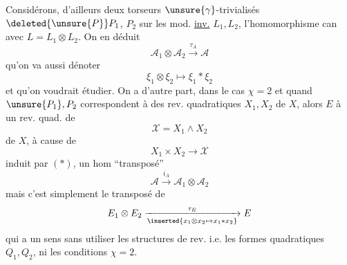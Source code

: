 Considérons, d'ailleurs deux torseurs $\unsure{\gamma}$-trivialisés $\deleted{\unsure{P}}P_1$, $P_2$ sur les mod. \uline{inv.} $L_1,L_2$, l'homomorphisme can
avec $L=L_1\otimes L_2$.
On en déduit
\[
\mathcal A_1\otimes\mathcal A_2\xrightarrow{\tau_A}\mathcal A
\]
qu'on va aussi dénoter
\[
\xi_1\otimes\xi_2\longmapsto\xi_1*\xi_2
\]
et qu'on voudrait étudier. On a d'autre part, dans le cas $\chi=2$ et quand $\unsure{P_1},P_2$ correspondent à des  rev. quadratiques $X_1,X_2$ de $X$, alors $E$ à un rev. quad. de 
\[
\mathcal X=X_1\wedge X_2
\]
de $X$, à cause de
\[
X_1\times X_2\longrightarrow\mathcal X
\]
induit par $(*)$, un hom ``transposé''
\[
\mathcal A\xrightarrow{i_A}\mathcal A_1\otimes\mathcal A_2
\]
mais c'est simplement le transposé de
\[
E_1\otimes E_2\xrightarrow[\inserted{x_1\otimes x_2\mapsto x_1*x_2}]{\tau_E}E
\]
qui a  un sens sans utiliser les structures de rev. i.e. les formes quadratiques $Q_1,Q_2$, ni les conditions $\chi=2$.
